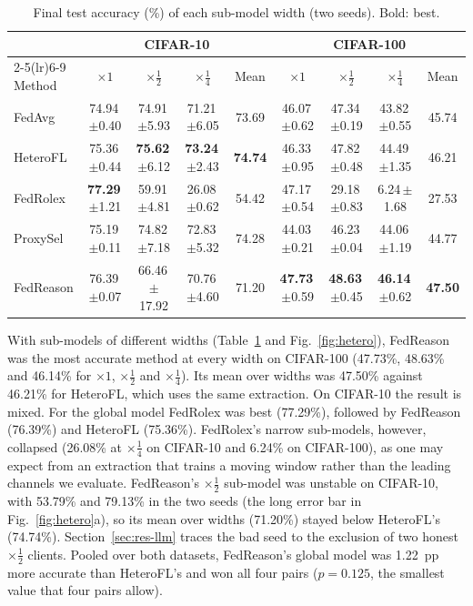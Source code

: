 \documentclass[3p,times,a4paper]{elsarticle}
\newcommand{\pmstd}[1]{\,{\scriptsize$\pm$#1}}
\begin{document}
\begin{table}[t]
\centering
\caption{Final test accuracy (\%) of each sub-model width (two seeds). Bold: best.}
\label{tab:hetero}
\small
\setlength{\tabcolsep}{4pt}
\begin{tabular}{@{}lcccccccc@{}}
\toprule
 & \multicolumn{4}{c}{CIFAR-10} & \multicolumn{4}{c}{CIFAR-100} \\
\cmidrule(lr){2-5}\cmidrule(lr){6-9}
Method & $\times1$ & $\times\frac12$ & $\times\frac14$ & Mean & $\times1$ & $\times\frac12$ & $\times\frac14$ & Mean \\
\midrule
FedAvg & 74.94\pmstd{0.40} & 74.91\pmstd{5.93} & 71.21\pmstd{6.05} & 73.69 & 46.07\pmstd{0.62} & 47.34\pmstd{0.19} & 43.82\pmstd{0.55} & 45.74 \\
HeteroFL & 75.36\pmstd{0.44} & \textbf{75.62}\pmstd{6.12} & \textbf{73.24}\pmstd{2.43} & \textbf{74.74} & 46.33\pmstd{0.95} & 47.82\pmstd{0.48} & 44.49\pmstd{1.35} & 46.21 \\
FedRolex & \textbf{77.29}\pmstd{1.21} & 59.91\pmstd{4.81} & 26.08\pmstd{0.62} & 54.42 & 47.17\pmstd{0.54} & 29.18\pmstd{0.83} & 6.24\pmstd{1.68} & 27.53 \\
ProxySel & 75.19\pmstd{0.11} & 74.82\pmstd{7.18} & 72.83\pmstd{5.32} & 74.28 & 44.03\pmstd{0.21} & 46.23\pmstd{0.04} & 44.06\pmstd{1.19} & 44.77 \\
FedReason & 76.39\pmstd{0.07} & 66.46\pmstd{17.92} & 70.76\pmstd{4.60} & 71.20 & \textbf{47.73}\pmstd{0.59} & \textbf{48.63}\pmstd{0.45} & \textbf{46.14}\pmstd{0.62} & \textbf{47.50} \\
\bottomrule
\end{tabular}
\end{table}

With sub-models of different widths (Table~\ref{tab:hetero} and Fig.~\ref{fig:hetero}), FedReason was the most accurate method at every width on CIFAR-100 (47.73\%, 48.63\% and 46.14\% for $\times1$, $\times\frac12$ and $\times\frac14$). Its mean over widths was 47.50\% against 46.21\% for HeteroFL, which uses the same extraction. On CIFAR-10 the result is mixed. For the global model FedRolex was best (77.29\%), followed by FedReason (76.39\%) and HeteroFL (75.36\%). FedRolex's narrow sub-models, however, collapsed (26.08\% at $\times\frac14$ on CIFAR-10 and 6.24\% on CIFAR-100), as one may expect from an extraction that trains a moving window rather than the leading channels we evaluate. FedReason's $\times\frac12$ sub-model was unstable on CIFAR-10, with 53.79\% and 79.13\% in the two seeds (the long error bar in Fig.~\ref{fig:hetero}a), so its mean over widths (71.20\%) stayed below HeteroFL's (74.74\%). Section~\ref{sec:res-llm} traces the bad seed to the exclusion of two honest $\times\frac12$ clients. Pooled over both datasets, FedReason's global model was 1.22~pp more accurate than HeteroFL's and won all four pairs ($p=0.125$, the smallest value that four pairs allow).
\end{document}
